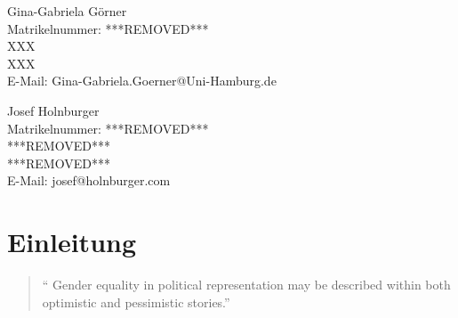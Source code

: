 \documentclass[12pt, 
    twoside=false, 
    bibliography=totoc, 
    numbers=endperiod, 
    headings=normal, 
    toc=chapterentrydotfill
    ]{scrbook}
\begin{document}
\begin{titlepage}
	\begin{minipage}[t]{0.48\textwidth}
    \flushleft 
    Gina-Gabriela Görner \\
    Matrikelnummer: ***REMOVED*** \\
    XXX \vspace{0.1cm} \\ 
	XXX \vspace{0.1cm}  \\
	E-Mail: Gina-Gabriela.Goerner@Uni-Hamburg.de \\ 
    \end{minipage}
    \begin{minipage}[t]{0.48\textwidth}
	\flushleft
	Josef Holnburger \\
	Matrikelnummer: ***REMOVED*** \\
	***REMOVED*** \vspace{0.1cm} \\
	***REMOVED*** \vspace{0.1cm} \\
	E-Mail: josef@holnburger.com \\
    \end{minipage}

\end{titlepage}

\frontmatter

\tableofcontents

\listoffigures
{}
\vspace*{24pt}
{\let\clearpage\relax \listoftables}	

\mainmatter



\chapter{Einleitung}\label{Einleitung} 

\begin{quote}
\enquote{
Gender equality in political representation may be described within both optimistic
and pessimistic stories.} \parencite[149]{celis_2018}
\end{quote}
\end{document}
